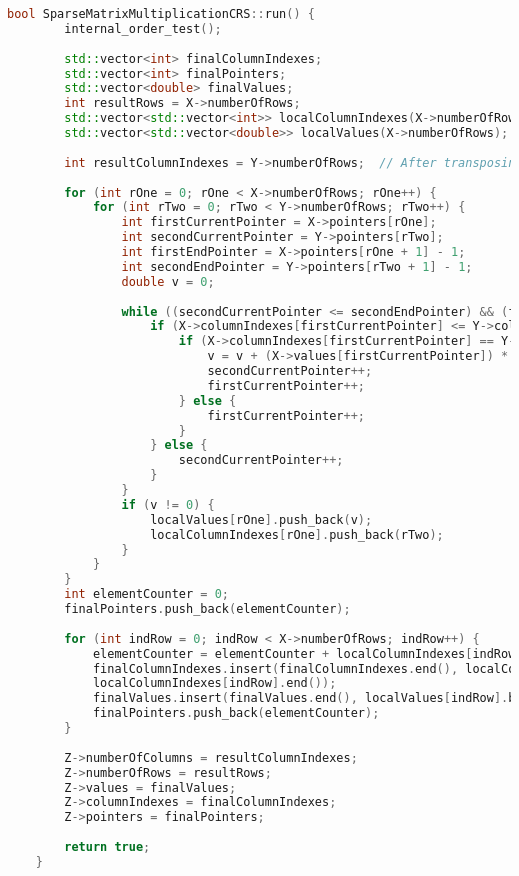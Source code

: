 \documentclass[a4paper, 14pt]{article}
\theoremstyle{plain}
\begin{document}
\begin{lstlisting}[language=C++,caption=Реализация метода run() в последовательной версии программы]
	bool SparseMatrixMultiplicationCRS::run() {
		internal_order_test();
		
		std::vector<int> finalColumnIndexes;
		std::vector<int> finalPointers;
		std::vector<double> finalValues;
		int resultRows = X->numberOfRows;
		std::vector<std::vector<int>> localColumnIndexes(X->numberOfRows);
		std::vector<std::vector<double>> localValues(X->numberOfRows);
		
		int resultColumnIndexes = Y->numberOfRows;  // After transposing matrix Y
		
		for (int rOne = 0; rOne < X->numberOfRows; rOne++) {
			for (int rTwo = 0; rTwo < Y->numberOfRows; rTwo++) {
				int firstCurrentPointer = X->pointers[rOne];
				int secondCurrentPointer = Y->pointers[rTwo];
				int firstEndPointer = X->pointers[rOne + 1] - 1;
				int secondEndPointer = Y->pointers[rTwo + 1] - 1;
				double v = 0;
				
				while ((secondCurrentPointer <= secondEndPointer) && (firstCurrentPointer <= firstEndPointer)) {
					if (X->columnIndexes[firstCurrentPointer] <= Y->columnIndexes[secondCurrentPointer]) {
						if (X->columnIndexes[firstCurrentPointer] == Y->columnIndexes[secondCurrentPointer]) {
							v = v + (X->values[firstCurrentPointer]) * (Y->values[secondCurrentPointer]);
							secondCurrentPointer++;
							firstCurrentPointer++;
						} else {
							firstCurrentPointer++;
						}
					} else {
						secondCurrentPointer++;
					}
				}
				if (v != 0) {
					localValues[rOne].push_back(v);
					localColumnIndexes[rOne].push_back(rTwo);
				}
			}
		}
		int elementCounter = 0;
		finalPointers.push_back(elementCounter);
		
		for (int indRow = 0; indRow < X->numberOfRows; indRow++) {
			elementCounter = elementCounter + localColumnIndexes[indRow].size();
			finalColumnIndexes.insert(finalColumnIndexes.end(), localColumnIndexes[indRow].begin(),
			localColumnIndexes[indRow].end());
			finalValues.insert(finalValues.end(), localValues[indRow].begin(), localValues[indRow].end());
			finalPointers.push_back(elementCounter);
		}
		
		Z->numberOfColumns = resultColumnIndexes;
		Z->numberOfRows = resultRows;
		Z->values = finalValues;
		Z->columnIndexes = finalColumnIndexes;
		Z->pointers = finalPointers;
		
		return true;
	}
\end{lstlisting}
\end{document}
